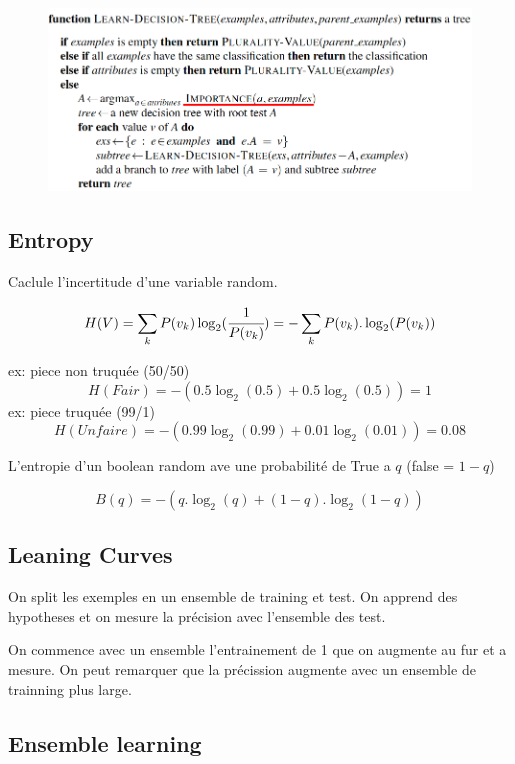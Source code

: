 \documentclass[12pt]{article}
\begin{document}
		\begin{figure}[H]
			\centering
			\includegraphics[width=.8\textwidth]{img/DTLA1.png}
		\end{figure}
		
	\subsection{Entropy}
		Caclule l'incertitude d'une variable random.
		
		\begin{equation}
			H(V) = \sum_{k}P(v_k)\log_2(\cfrac{1}{P(v_k)}) = -\sum_{k}P(v_k).\log_2(P(v_k))
		\end{equation}
		
		ex: piece non truquée (50/50)
		\begin{equation}
			H(Fair) = -(0.5\log_2(0.5) + 0.5\log_2(0.5)) = 1
		\end{equation}
		ex: piece truquée (99/1)
		\begin{equation} 
			H(Unfaire) = -(0.99\log_2(0.99) + 0.01\log_2(0.01)) = 0.08
		\end{equation}
		
		L'entropie d'un boolean random ave une probabilité de True a $q$ (false = $1-q$)
		
		\begin{equation}
			B(q) = -(q.\log_2(q) + (1-q).\log_2(1-q))
		\end{equation}
		
	\subsection{Leaning Curves}
		On split les exemples en un ensemble de training et test. On apprend des hypotheses et on mesure la précision avec l'ensemble des test.
		
		On commence avec un ensemble l'entrainement de 1 que on augmente au fur et a mesure. On peut remarquer que la précission augmente avec un ensemble de trainning plus large. 
		
	\subsection{Ensemble learning}
	
\end{document}
